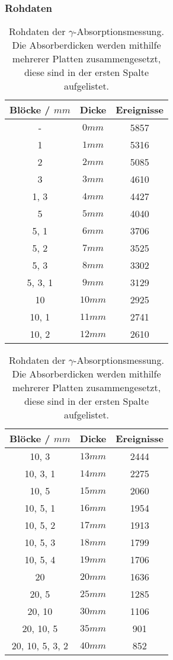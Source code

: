 \documentclass{../Misc/MontavonLaTeX/Montavon}
\begin{document}
\subsubsection{Rohdaten}
\begin{table}[htbp]
\centering
\begin{tabular}{|c|c||c|}
\hline
Blöcke / $\unit{mm}$ & Dicke & Ereignisse \\
\hline
- & $0 \unit{mm}$ & 5857 \\
1 & $1 \unit{mm}$ & 5316 \\
2 & $2 \unit{mm}$ & 5085 \\
3 & $3 \unit{mm}$ & 4610 \\
1, 3 & $4 \unit{mm}$ & 4427 \\
5 & $5 \unit{mm}$ & 4040 \\
5, 1 & $6 \unit{mm}$ & 3706 \\
5, 2 & $7 \unit{mm}$ & 3525 \\
5, 3 & $8 \unit{mm}$ & 3302 \\
5, 3, 1 & $9 \unit{mm}$ & 3129 \\
10 & $10 \unit{mm}$ & 2925 \\
10, 1 & $11 \unit{mm}$ & 2741 \\
10, 2 & $12 \unit{mm}$ & 2610 \\
\hline
\end{tabular}
\begin{tabular}{|c|c||c|}
\hline
Blöcke / $\unit{mm}$ & Dicke & Ereignisse \\
\hline
10, 3 & $13 \unit{mm}$ & 2444 \\
10, 3, 1 & $14 \unit{mm}$ & 2275 \\
10, 5 & $15 \unit{mm}$ & 2060 \\
10, 5, 1 & $16 \unit{mm}$ & 1954 \\
10, 5, 2 & $17 \unit{mm}$ & 1913 \\
10, 5, 3 & $18 \unit{mm}$ & 1799 \\
10, 5, 4 & $19 \unit{mm}$ & 1706 \\
20 & $20 \unit{mm}$ & 1636 \\
20, 5 & $25 \unit{mm}$ & 1285 \\
20, 10 & $30 \unit{mm}$ & 1106 \\
20, 10, 5 & $35 \unit{mm}$ & 901 \\
20, 10, 5, 3, 2 & $40 \unit{mm}$ & 852 \\
\hline
\end{tabular}
\caption{Rohdaten der $\gamma$-Absorptionsmessung. Die Absorberdicken werden mithilfe mehrerer Platten zusammengesetzt, diese sind in der ersten Spalte aufgelistet.}
\label{tbl:gamma_absorb_raw}
\end{table}
\end{document}
